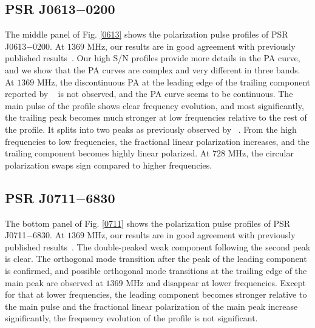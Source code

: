 \documentclass[useAMS,usenatbib]{mn2e}
\begin{document}
\begin{appendices}
\subsection{PSR J0613$-$0200}

The middle panel of Fig. \ref{0613} shows the polarization pulse profiles of 
PSR J0613$-$0200.
%
At $1369$ MHz, our results are in good agreement with previously published
results~\citep{Ord04,Yan11}. 
%
Our high S/N profiles provide more details in the PA curve, and we show that 
the PA curves are complex and very different in three bands. 
%
At $1369$ MHz, the discontinuous PA at the leading edge of the trailing 
component reported by ~\citet{Yan11} is not observed, and the PA curve seems 
to be continuous.
%
The main pulse of the profile shows clear frequency evolution, and most 
significantly, the trailing peak becomes much stronger at low frequencies 
relative to the rest of the profile. It splits into two peaks as previously
observed by ~\citet{Stairs99}.
%
From the high frequencies to low frequencies, the fractional linear 
polarization increases, and the trailing component becomes highly linear 
polarized. 
%
At $728$ MHz, the circular polarization swaps sign compared to higher 
frequencies.
%


\subsection{PSR J0711$-$6830}

The bottom panel of Fig. \ref{0711} shows the polarization pulse profiles 
of PSR J0711$-$6830.
%
At $1369$ MHz, our results are in good agreement with previously published
results~\citep{Ord04,Yan11}. 
%
The double-peaked weak component following the second peak is clear.
%
The orthogonal mode transition after the peak of the leading component 
is confirmed, and possible orthogonal mode transitions at the trailing edge 
of the main peak are observed at $1369$ MHz and disappear at lower frequencies.
%
Except for that at lower frequencies, the leading component becomes stronger  
relative to the main pulse and the fractional linear polarization of the 
main peak increase significantly, the frequency evolution of the profile 
is not significant.


\end{appendices}
\end{document}
